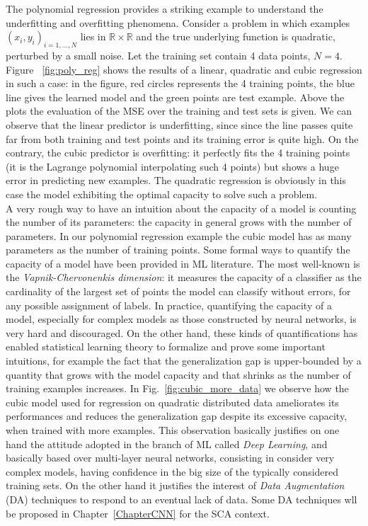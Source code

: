 The polynomial regression provides a striking example to understand the underfitting and overfitting phenomena. Consider a problem in which examples $(x_i,y_i)_{i=1,\dots,N}$ lies in $\mathbb{R} \times \mathbb{R}$ and the true underlying function is quadratic, perturbed by a small noise. Let the training set contain 4 data points, \ie $N=4$. Figure ~\ref{fig:poly_reg} shows the results of a linear, quadratic and cubic regression in such a case: in the figure, red circles represents the 4 training points, the blue line gives the learned model and the green points are test example. Above the plots the evaluation of the MSE over the training and test sets is given. We can observe that the linear predictor is underfitting, since since the line passes quite far from both training and test points and its training error is quite high. On the contrary, the cubic predictor is overfitting: it perfectly fits the 4 training points (it is the Lagrange polynomial interpolating such 4 points) but shows a huge error in predicting new examples. The quadratic regression is obviously in this case the model exhibiting the optimal capacity to solve such a problem. \\

A very rough way to have an intuition about the capacity of a model is counting the number of its parameters: the capacity in general grows with the number of parameters. In our polynomial regression example the cubic model has as many parameters as the number of training points. Some formal ways to quantify the capacity of a model have been provided in ML literature. The most well-known is the \emph{Vapnik-Chervonenkis dimension}: it measures the capacity of a classifier as the cardinality of the largest set of points the model can classify without errors, for any possible assignment of labels. In practice, quantifying the capacity of a model, especially for complex models as those constructed by neural networks, is very hard and discouraged. On the other hand, these kinds of quantifications has enabled statistical learning theory to formalize and prove some important intuitions, for example the fact that the generalization gap is upper-bounded by a quantity that grows with the model capacity and that shrinks as the number of training examples increases. In Fig.~\ref{fig:cubic_more_data} we observe how the cubic model used for regression on quadratic distributed data ameliorates its performances and reduces the generalization gap despite its excessive capacity, when trained with more examples. This observation basically justifies on one hand the attitude adopted in the branch of ML called \emph{Deep Learning}, and basically based over multi-layer neural networks, consisting in consider very complex models, having confidence in the big size of the typically considered training sets. On the other hand it justifies the interest of \emph{Data Augmentation} (DA) techniques to respond to an eventual lack of data. Some DA techniques wll be proposed in Chapter~\ref{ChapterCNN} for the SCA context.

